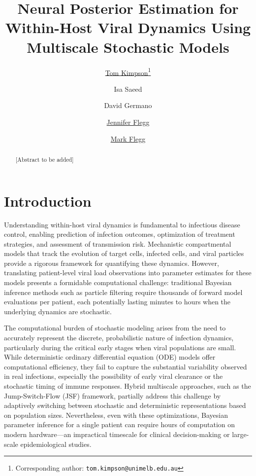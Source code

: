 \documentclass{article}
\title{Neural Posterior Estimation for Within-Host Viral Dynamics Using Multiscale Stochastic Models}
\author[1]{%
	\href{https://orcid.org/0000-0002-6542-6032}{\usebox{\orcid}\hspace{1mm}Tom Kimpson\thanks{Corresponding author: \texttt{tom.kimpson@unimelb.edu.au}}}%
}
\author[3]{%
	\hspace{1mm}Isa Saeed%
}
\author[3]{%
	\hspace{1mm}David Germano%
}
\author[1]{%
	\href{https://orcid.org/0000-0002-8809-726X}{\usebox{\orcid}\hspace{1mm}Jennifer Flegg}%
}
\author[2]{%
	\href{https://orcid.org/0000-0001-6254-313X}{\usebox{\orcid}\hspace{1mm}Mark Flegg}%
}
\affil[1]{School of Mathematics and Statistics, The University of Melbourne, Parkville, VIC 3010, Australia}
\affil[2]{School of Mathematics, Monash University, Clayton, VIC 3800, Australia}
\affil[3]{[Affiliation to be added - update as needed]}
\begin{document}
\maketitle





\begin{abstract}
[Abstract to be added]
\end{abstract}




\section{Introduction}
\label{sec:introduction}

Understanding within-host viral dynamics is fundamental to infectious disease control, enabling prediction of infection outcomes, optimization of treatment strategies, and assessment of transmission risk. Mechanistic compartmental models that track the evolution of target cells, infected cells, and viral particles provide a rigorous framework for quantifying these dynamics. However, translating patient-level viral load observations into parameter estimates for these models presents a formidable computational challenge: traditional Bayesian inference methods such as particle filtering require thousands of forward model evaluations per patient, each potentially lasting minutes to hours when the underlying dynamics are stochastic.

The computational burden of stochastic modeling arises from the need to accurately represent the discrete, probabilistic nature of infection dynamics, particularly during the critical early stages when viral populations are small. While deterministic ordinary differential equation (ODE) models offer computational efficiency, they fail to capture the substantial variability observed in real infections, especially the possibility of early viral clearance or the stochastic timing of immune responses. Hybrid multiscale approaches, such as the Jump-Switch-Flow (JSF) framework, partially address this challenge by adaptively switching between stochastic and deterministic representations based on population sizes. Nevertheless, even with these optimizations, Bayesian parameter inference for a single patient can require hours of computation on modern hardware—an impractical timescale for clinical decision-making or large-scale epidemiological studies.
\end{document}
